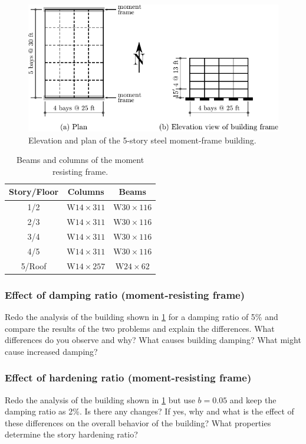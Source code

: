 \documentclass{simcenterdocumentation}
\begin{document}
\begin{figure}[H]
	\centering \includegraphics[scale=1]{5story_steel_frame.pdf}
	\caption{Elevation and plan of the 5-story steel moment-frame building.}
	\label{fig:5story_steel_frame}
\end{figure}
\begin{table}[H]
	\centering \caption{Beams and columns of the moment resisting frame.}
	\label{tab:tab1}
	\begin{tabular}{ccc} \toprule
	Story/Floor			& Columns						& Beams
	\\ \midrule
	1/2					& $\mathrm{W14 \times 311}$		& $\mathrm{W30 \times 116}$	\\
	2/3					& $\mathrm{W14 \times 311}$		& $\mathrm{W30 \times 116}$	\\
	3/4					& $\mathrm{W14 \times 311}$		& $\mathrm{W30 \times 116}$	\\
	4/5					& $\mathrm{W14 \times 311}$		& $\mathrm{W30 \times 116}$	\\
	5/Roof				& $\mathrm{W14 \times 257}$		& $\mathrm{W24 \times 62}$	\\ \bottomrule
	\end{tabular}
\end{table}


\subsubsection{Effect of damping ratio (moment-resisting frame)} Redo the analysis of the building shown in \cref{fig:5story_steel_frame} for a damping ratio of 5\% and compare the results of the two problems and explain the differences. What differences do you observe and why? What causes building damping? What might cause increased damping?

\subsubsection{Effect of hardening ratio (moment-resisting frame)} Redo the analysis of the building shown in \cref{fig:5story_steel_frame} but use $b = 0.05$ and keep the damping ratio as 2\%. Is there any changes? If yes, why and what is the effect of these differences on the overall behavior of the building?  What properties determine the story hardening ratio?
\end{document}
